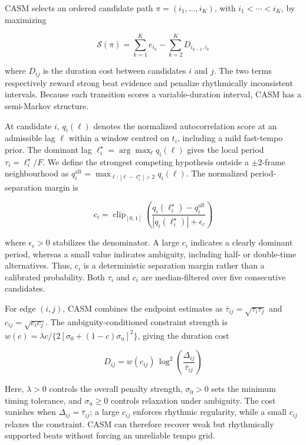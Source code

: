 \documentclass{article}
\newif\ifshowchanges
\newcommand{\rev}[1]{%
  \ifshowchanges
    \textcolor{red}{#1}%
  \else
    #1%
  \fi
}
\begin{document}
\rev{CASM selects an ordered candidate path
$\pi=(i_1,\ldots,i_K)$, with $i_1<\cdots<i_K$, by maximizing}

\begin{equation}
\rev{
\mathcal S(\pi)
=
\sum_{k=1}^{K} e_{i_k}
-
\sum_{k=2}^{K}D_{i_{k-1},i_k}
}
\label{eq:casm-objective}
\end{equation}

\rev{where $D_{ij}$ is the duration cost between candidates $i$ and $j$.
The two terms respectively reward strong beat evidence and penalize
rhythmically inconsistent intervals. Because each transition scores a
variable-duration interval, CASM has a semi-Markov structure.}

\rev{At candidate $i$, $q_i(\ell)$ denotes the normalized
autocorrelation score at an admissible lag $\ell$ within a window
centred on $t_i$, including a mild fast-tempo prior. The dominant lag
$\ell_i^\star=\arg\max_\ell q_i(\ell)$ gives the local period
$\tau_i=\ell_i^\star/F$. We define the strongest competing hypothesis
outside a $\pm2$-frame neighbourhood as
$q_i^{\mathrm{alt}}
=\max_{\ell:\,|\ell-\ell_i^\star|>2}q_i(\ell)$.
The normalized period-separation margin is}

\begin{equation}
\rev{
c_i =
\operatorname{clip}_{[0,1]}\!\left(
\frac{
q_i(\ell_i^\star)-q_i^{\mathrm{alt}}
}{
|q_i(\ell_i^\star)|+\epsilon_c
}
\right)
}
\label{eq:casm-reliability}
\end{equation}

\rev{where $\epsilon_c>0$ stabilizes the denominator. A large $c_i$
indicates a clearly dominant period, whereas a small value indicates
ambiguity, including half- or double-time alternatives. Thus, $c_i$ is
a deterministic separation margin rather than a calibrated
probability. Both $\tau_i$ and $c_i$ are median-filtered over five
consecutive candidates.}

\rev{For edge $(i,j)$, CASM combines the endpoint estimates as
$\bar{\tau}_{ij}=\sqrt{\tau_i\tau_j}$ and
$c_{ij}=\sqrt{c_i c_j}$. The ambiguity-conditioned constraint strength
is
$w(c)=\lambda c/\{2[\sigma_0+(1-c)\sigma_{\mathrm u}]^2\}$,
giving the duration cost}

\begin{equation}
\rev{
D_{ij}
=
w(c_{ij})\,
\log^2\!\left(
\frac{\Delta_{ij}}{\bar{\tau}_{ij}}
\right)
}
\label{eq:casm-duration}
\end{equation}

\rev{Here, $\lambda>0$ controls the overall penalty strength,
$\sigma_0>0$ sets the minimum timing tolerance, and
$\sigma_{\mathrm u}\geq0$ controls relaxation under ambiguity.
The cost vanishes when $\Delta_{ij}=\bar{\tau}_{ij}$; a large $c_{ij}$
enforces rhythmic regularity, while a small $c_{ij}$ relaxes the
constraint. CASM can therefore recover weak but rhythmically supported
beats without forcing an unreliable tempo grid.}
\end{document}
